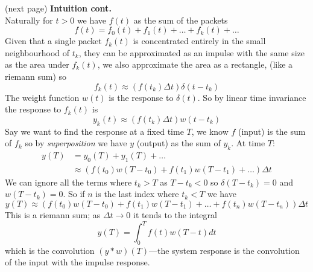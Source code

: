 \documentclass{report}
\begin{document}
(next page)\newpage
\noindent\textbf{Intuition cont.}\\
Naturally for $t>0$ we have $f(t)$ as the sum of the packets
\begin{equation*}
f(t)=f_0(t)+f_1(t)+\ldots+f_k(t)+\ldots
\end{equation*}
Given that a single packet $f_k(t)$ is concentrated entirely in the small neighbourhood of $t_k$, they can be
approximated as an impulse with the same size as the area under $f_k(t)$, we also approximate the 
area as a rectangle, (like a riemann sum) so 
\begin{equation*}
f_k(t)\approx(f(t_k)\Delta t)\delta(t-t_k)
\end{equation*}
The weight function $w(t)$ is the response to $\delta(t)$. So by linear time invariance the response to $f_k(t)$ is
\begin{equation*}
y_k(t)\approx(f(t_k)\Delta t)w(t-t_k)
\end{equation*}
Say we want to find the response at a fixed time $T$, we
know $f$ (input) is the sum of $f_k$ so by \textit{superposition}
we have $y$ (output) as the sum of $y_k$. At time $T$:
\begin{align*}
y(T)&=y_0(T)+y_1(T)+\ldots\\
&\approx\left(f(t_0)w(T-t_0)+f(t_1)w(T-t_1)+\ldots\right)\Delta t
\end{align*}
We can ignore all the terms where $t_k>T$ as $T-t_k<0$ so $\delta(T-t_k)=0$ and $w(T-t_k)=0$. So
if $n$ is the last index where $t_k<T$ we have
\begin{equation*}
y(T)\approx\left(f(t_0)w(T-t_0)+f(t_1)w(T-t_1)+\ldots+
f(t_n)w(T-t_n)\right)\Delta t
\end{equation*}
This is a riemann sum; as $\Delta t\to0$ it tends to the integral
\begin{equation*}
y(T)=\int^T_0f(t)w(T-t)dt
\end{equation*}
which is the convolution $(y*w)(T)$---the system response is the convolution of the input with the impulse response.
\end{document}
